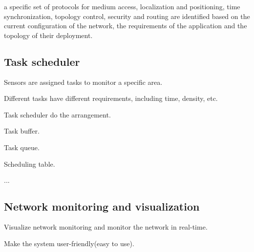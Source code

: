 a specific set of protocols for medium access, localization and positioning, time synchronization, topology control, security and routing are identified based on the current configuration of the network, the requirements of the application and the topology of their deployment.

\subsection{Task scheduler}
Sensors are assigned tasks to monitor a specific area.

Different tasks have different requirements, including time, density, etc.

Task scheduler do the arrangement. 

Task buffer.

Task queue.

Scheduling table.

...

\subsection{Network monitoring and visualization}

Visualize network monitoring and monitor the network in real-time.

Make the system user-friendly(easy to use).
